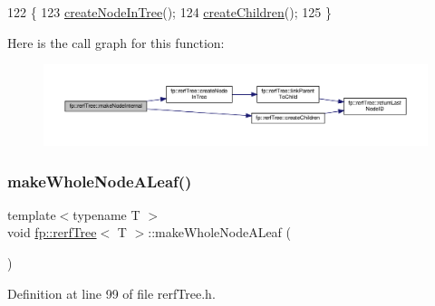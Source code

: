 \begin{DoxyCode}
122                                               \{
123                     \hyperlink{classfp_1_1rerfTree_a44f22d50d958ac20c12cf6714811e67c}{createNodeInTree}();
124                     \hyperlink{classfp_1_1rerfTree_a75ebcd9e258fdb49094e008e121bfe0a}{createChildren}();
125                 \}
\end{DoxyCode}
Here is the call graph for this function\+:
\nopagebreak
\begin{figure}[H]
\begin{center}
\leavevmode
\includegraphics[width=350pt]{classfp_1_1rerfTree_adc3c8f338accaa401098a63d826390d3_cgraph}
\end{center}
\end{figure}
\mbox{\label{classfp_1_1rerfTree_a2cc428162305a46d79268addda902688}} 
\subsubsection{\texorpdfstring{make\+Whole\+Node\+A\+Leaf()}{makeWholeNodeALeaf()}}
{\footnotesize\ttfamily template$<$typename T $>$ \\
void \hyperlink{classfp_1_1rerfTree}{fp\+::rerf\+Tree}$<$ T $>$\+::make\+Whole\+Node\+A\+Leaf (\begin{DoxyParamCaption}{ }\end{DoxyParamCaption})\hspace{0.3cm}{\ttfamily [inline]}}



Definition at line 99 of file rerf\+Tree.\+h.


